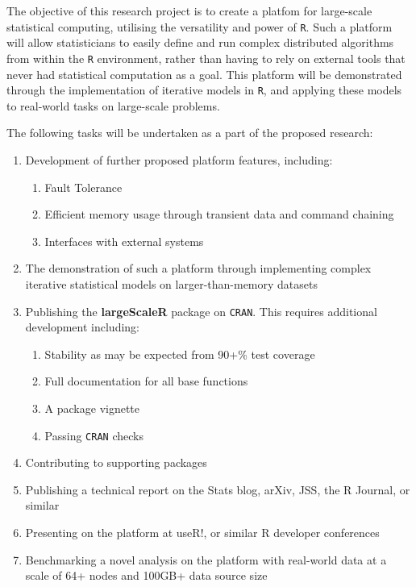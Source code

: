 The objective of this research project is to create a platfom for large-scale statistical computing, utilising the versatility and power of \texttt{R}.
Such a platform will allow statisticians to easily define and run complex distributed algorithms from within the \texttt{R} environment, rather than having to rely on external tools that never had statistical computation as a goal.
This platform will be demonstrated through the implementation of iterative models in \texttt{R}, and applying these models to real-world tasks on large-scale problems.

The following tasks will be undertaken as a part of the proposed research:

\begin{enumerate}
        \item Development of further proposed platform features, including:
                \begin{enumerate}
                        \item Fault Tolerance
                        \item Efficient memory usage through transient data and command chaining
                        \item Interfaces with external systems
                \end{enumerate}
        \item The demonstration of such a platform through implementing complex iterative statistical models on larger-than-memory datasets
	\item Publishing the \textbf{largeScaleR} package on \texttt{CRAN}. This requires additional development including:
                \begin{enumerate}
                        \item Stability as may be expected from 90+\% test coverage
                        \item Full documentation for all base functions
                        \item A package vignette
			\item Passing \texttt{CRAN} checks
                \end{enumerate}
        \item Contributing to supporting packages
        \item Publishing a technical report on the Stats blog, arXiv, JSS, the R Journal, or similar
        \item Presenting on the platform at useR!, or similar R developer conferences
        \item Benchmarking a novel analysis on the platform with real-world data at a scale of 64+ nodes and 100GB+ data source size
\end{enumerate}

